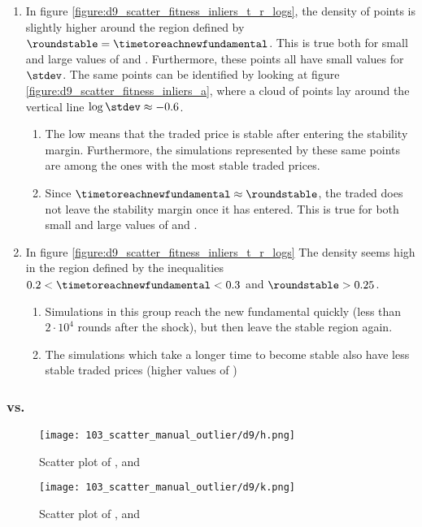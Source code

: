 \begin{enumerate}
\item In figure \ref{figure:d9_scatter_fitness_inliers_t_r_logs}, the density of points is slightly higher around the region defined by $\roundstable = \timetoreachnewfundamental$. This is true both for small and large values of \timetoreachnewfundamental and \roundstable. Furthermore, these points all have small values for $\stdev$. The same points can be identified by looking at figure \ref{figure:d9_scatter_fitness_inliers_a}, where a cloud of points lay around the vertical line $\log \stdev \approx -0.6$.
\begin{enumerate}
	\item The low \stdev means that the traded price is stable after entering the stability margin. Furthermore, the simulations represented by these same points are among the ones with the most stable traded prices.
	\item Since $\timetoreachnewfundamental \approx \roundstable$, the traded does not leave the stability margin once it has entered. This is true for both small and large values of \timetoreachnewfundamental and \roundstable.
\end{enumerate}
\item In figure \ref{figure:d9_scatter_fitness_inliers_t_r_logs} The density seems high in the region defined by the inequalities $0.2 < \timetoreachnewfundamental < 0.3$ and $\roundstable > 0.25$. 
	\begin{enumerate}
	\item Simulations in this group reach the new fundamental quickly (less than $2\cdot 10^4$ rounds after the shock), but then leave the stable region again.
	\item The simulations which take a longer time to become stable also have less stable traded prices (higher values of \stdev)
	\end{enumerate}
\end{enumerate}



\subsubsection{\stdev vs. \timetoreachnewfundamental}
\begin{figure}
\centering
\texttt{[image: 103\_scatter\_manual\_outlier/d9/h.png]}
\caption{Scatter plot of \roundstable, \timetoreachnewfundamental and \stdev}
\label{figure:d9_scatter_fitness_inliers_logs_t_r}
\end{figure}
\begin{figure}
\centering
\texttt{[image: 103\_scatter\_manual\_outlier/d9/k.png]}
\caption{Scatter plot of \roundstable, \timetoreachnewfundamental and \overshoot}
\label{figure:d9_scatter_fitness_inliers_logs_t_o}
\end{figure}

